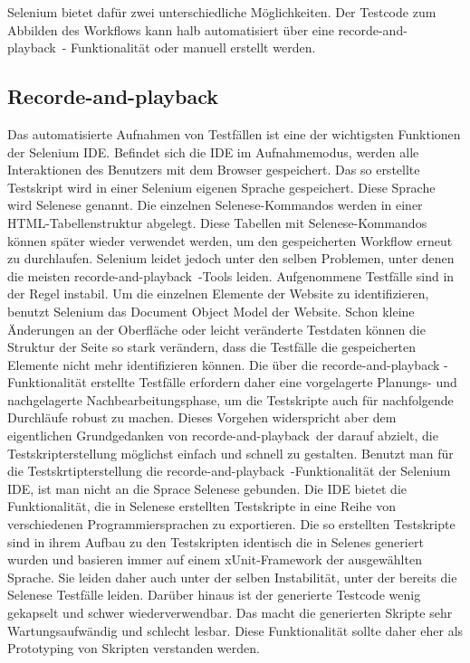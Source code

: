 Selenium bietet dafür zwei unterschiedliche Möglichkeiten. Der Testcode zum Abbilden des Workflows kann halb automatisiert über eine \glqq recorde-and-playback\glqq\ - Funktionalität oder manuell erstellt werden.

\subsection{Recorde-and-playback}
\label{sec:recorde_and_playback}
Das automatisierte Aufnahmen von Testfällen ist eine der wichtigsten Funktionen der
Selenium IDE. Befindet sich die IDE im Aufnahmemodus, werden alle Interaktionen des Benutzers mit dem Browser gespeichert. Das so erstellte Testskript wird in einer Selenium eigenen Sprache gespeichert. Diese Sprache wird Selenese genannt. Die einzelnen Selenese-Kommandos werden in einer HTML-Tabellenstruktur abgelegt. Diese Tabellen mit Selenese-Kommandos können später wieder verwendet werden, um den gespeicherten Workflow erneut zu durchlaufen.
Selenium leidet jedoch unter den selben Problemen, unter denen die meisten \glqq recorde-and-playback\glqq\ -Tools leiden. Aufgenommene Testfälle sind in der Regel instabil.
Um die einzelnen Elemente der Website zu identifizieren, benutzt Selenium das Document Object Model der Website. Schon kleine Änderungen an der Oberfläche oder leicht veränderte Testdaten können die Struktur der Seite so stark verändern, dass die Testfälle die gespeicherten Elemente nicht mehr identifizieren können. Die über die \glqq recorde-and-playback \glqq -Funktionalität erstellte Testfälle erfordern daher eine vorgelagerte Planungs- und nachgelagerte Nachbearbeitungsphase, um die Testskripte auch für nachfolgende Durchläufe robust zu machen. Dieses Vorgehen widerspricht aber dem eigentlichen Grundgedanken von \glqq recorde-and-playback\glqq\ der darauf abzielt, die Testskripterstellung möglichst einfach und schnell zu gestalten.
\newline
Benutzt man für die Testskrtipterstellung die \glqq recorde-and-playback\glqq\ -Funktionalität der Selenium IDE, ist man nicht an die Sprace Selenese gebunden. Die IDE bietet die Funktionalität, die in Selenese erstellten Testskripte in eine Reihe von verschiedenen Programmiersprachen zu exportieren.
Die so erstellten Testskripte sind in ihrem Aufbau zu den Testskripten identisch die in Selenes generiert wurden und basieren immer auf einem xUnit-Framework der ausgewählten Sprache.
Sie leiden daher auch unter der selben Instabilität, unter der bereits die Selenese Testfälle leiden. Darüber hinaus ist der generierte Testcode wenig gekapselt und schwer wiederverwendbar. Das macht die generierten Skripte sehr Wartungsaufwändig und schlecht lesbar.
Diese Funktionalität sollte daher eher als Prototyping von Skripten verstanden werden.


